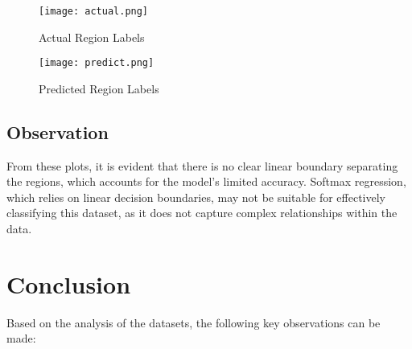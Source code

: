 \documentclass[11pt]{article}
\begin{document}
\begin{figure}[H]
    \centering
    \begin{minipage}{0.5\textwidth}
        \centering
        \texttt{[image: actual.png]}
        \caption{Actual Region Labels}
        \label{fig:actual}
    \end{minipage}\hfill
    \begin{minipage}{0.5\textwidth}
        \centering
        \texttt{[image: predict.png]}
        \caption{Predicted Region Labels}
        \label{fig:predict}
    \end{minipage}
\end{figure}

\subsection{Observation}
From these plots, it is evident that there is no clear linear boundary separating the regions, which accounts for the model's limited accuracy. Softmax regression, which relies on linear decision boundaries, may not be suitable for effectively classifying this dataset, as it does not capture complex relationships within the data.
\section{Conclusion}
Based on the analysis of the datasets, the following key observations can be made:
\end{document}
